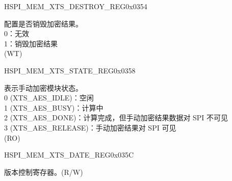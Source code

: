 \begin{register}{H}{SPI\_MEM\_XTS\_DESTROY\_REG}{0x0354}\label{regdesc:SPIMEMXTSDESTROYREG}
%
%
\regnewline%
\begin{regdesc}\begin{reglist}
\label{fielddesc:SPIMEMXTSDESTROY}\item [SPI\_MEM\_XTS\_DESTROY] 配置是否销毁加密结果。\\
0：无效\\
1：销毁加密结果\\
(WT)
\end{reglist}\end{regdesc}
\end{register}


\begin{register}{H}{SPI\_MEM\_XTS\_STATE\_REG}{0x0358}\label{regdesc:SPIMEMXTSSTATEREG}
%
%
\regnewline%
\begin{regdesc}\begin{reglist}
\label{fielddesc:SPIMEMXTSSTATE}\item [SPI\_MEM\_XTS\_STATE] 表示手动加密模块状态。\\
0 (XTS\_AES\_IDLE)：空闲\\
1 (XTS\_AES\_BUSY)：计算中\\
2 (XTS\_AES\_DONE)：计算完成，但手动加密结果数据对 SPI 不可见\\
3 (XTS\_AES\_RELEASE)：手动加密结果对 SPI 可见\\
(RO)
\end{reglist}\end{regdesc}
\end{register}


\begin{register}{H}{SPI\_MEM\_XTS\_DATE\_REG}{0x035C}\label{regdesc:SPIMEMXTSDATEREG}
%
%
\regnewline%
\begin{regdesc}\begin{reglist}
\label{fielddesc:SPIMEMXTSDATE}\item [SPI\_MEM\_XTS\_DATE] 版本控制寄存器。(R/W)
\end{reglist}\end{regdesc}
\end{register}


